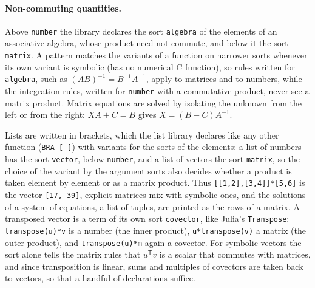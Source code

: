 \documentclass[11pt,a4paper]{article}
\begin{document}
\paragraph{Non-commuting quantities.} Above \texttt{number} the library
declares the sort \texttt{algebra} of the elements of an associative
algebra, whose product need not commute, and below it the sort
\texttt{matrix}. A pattern matches the variants of a function on narrower
sorts whenever its own variant is symbolic (has no numerical C function),
so rules written for \texttt{algebra}, such as $(AB)^{-1}=B^{-1}A^{-1}$,
apply to matrices and to numbers, while the integration rules, written
for \texttt{number} with a commutative product, never see a matrix
product. Matrix equations are solved by isolating the unknown from the
left or from the right: $XA+C=B$ gives $X=(B-C)A^{-1}$.

Lists are written in brackets, which the list library declares like any
other function (\texttt{BRA [ ]}) with variants for the sorts of the
elements: a list of numbers has the sort \texttt{vector}, below
\texttt{number}, and a list of vectors the sort \texttt{matrix}, so the
choice of the variant by the argument sorts also decides whether a
product is taken element by element or as a matrix product. Thus
\texttt{[[1,2],[3,4]]*[5,6]} is the vector \texttt{[17, 39]}, explicit
matrices mix with symbolic ones, and the solutions of a system of
equations, a list of tuples, are printed as the rows of a matrix.
A transposed vector is a term of its own sort \texttt{covector}, like
Julia's \texttt{Transpose}: \texttt{transpose(u)*v} is a number (the inner
product), \texttt{u*transpose(v)} a matrix (the outer product), and
\texttt{transpose(u)*m} again a covector. For symbolic vectors the sort
alone tells the matrix rules that $u^{\mathsf T}v$ is a scalar that
commutes with matrices, and since transposition is linear, sums and
multiples of covectors are taken back to vectors, so that a handful of
declarations suffice.
\end{document}

